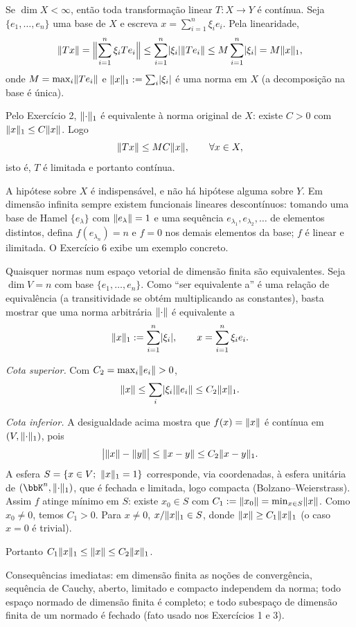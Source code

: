 \begin{exercicio}{Se $\dim X<\infty$, então toda transformação linear $T:X\to Y$ é contínua.}
\sol
Seja $\{e_1,\dots,e_n\}$ uma base de $X$ e escreva $x=\sum_{i=1}^n\xi_ie_i$. Pela linearidade,
\[ \lVert Tx\rVert=\Bigl\|\sum_{i=1}^n\xi_iTe_i\Bigr\|\le\sum_{i=1}^n\lvert\xi_i\rvert\lVert Te_i\rVert\le M\sum_{i=1}^n\lvert\xi_i\rvert=M\lVert x\rVert_1, \]
onde $M=\max_i\lVert Te_i\rVert$ e $\lVert x\rVert_1:=\sum_i\lvert\xi_i\rvert$ é uma norma em $X$ (a decomposição na base é única).

Pelo Exercício 2, $\lVert\cdot\rVert_1$ é equivalente à norma original de $X$: existe $C>0$ com $\lVert x\rVert_1\le C\lVert x\rVert$. Logo
\[ \lVert Tx\rVert\le MC\lVert x\rVert,\qquad \forall x\in X, \]
isto é, $T$ é limitada e portanto contínua.

\begin{obs}
A hipótese sobre $X$ é indispensável, e não há hipótese alguma sobre $Y$. Em dimensão infinita sempre existem funcionais lineares descontínuos: tomando uma base de Hamel $\{e_\lambda\}$ com $\lVert e_\lambda\rVert=1$ e uma sequência $e_{\lambda_1},e_{\lambda_2},\dots$ de elementos distintos, defina $f(e_{\lambda_n})=n$ e $f=0$ nos demais elementos da base; $f$ é linear e ilimitada. O Exercício 6 exibe um exemplo concreto.
\end{obs}
\end{exercicio}

\begin{exercicio}{Quaisquer normas num espaço vetorial de dimensão finita são equivalentes.}
\sol
Seja $\dim V=n$ com base $\{e_1,\dots,e_n\}$. Como ``ser equivalente a'' é uma relação de equivalência (a transitividade se obtém multiplicando as constantes), basta mostrar que uma norma arbitrária $\lVert\cdot\rVert$ é equivalente a
\[ \lVert x\rVert_1:=\sum_{i=1}^n\lvert\xi_i\rvert,\qquad x=\sum_{i=1}^n\xi_ie_i. \]

\emph{Cota superior.} Com $C_2=\max_i\lVert e_i\rVert>0$,
\[ \lVert x\rVert\le\sum_i\lvert\xi_i\rvert\lVert e_i\rVert\le C_2\lVert x\rVert_1. \]

\emph{Cota inferior.} A desigualdade acima mostra que $f(x)=\lVert x\rVert$ é contínua em $(V,\lVert\cdot\rVert_1)$, pois
\[ \bigl|\lVert x\rVert-\lVert y\rVert\bigr|\le\lVert x-y\rVert\le C_2\lVert x-y\rVert_1. \]
A esfera $S=\{x\in V;\ \lVert x\rVert_1=1\}$ corresponde, via coordenadas, à esfera unitária de $(\K^n,\norm{\cdot}_1)$, que é fechada e limitada, logo compacta (Bolzano--Weierstrass). Assim $f$ atinge mínimo em $S$: existe $x_0\in S$ com $C_1:=\lVert x_0\rVert=\min_{x\in S}\lVert x\rVert$. Como $x_0\neq0$, temos $C_1>0$. Para $x\neq0$, $x/\lVert x\rVert_1\in S$, donde $\lVert x\rVert\ge C_1\lVert x\rVert_1$ (o caso $x=0$ é trivial).

Portanto $C_1\lVert x\rVert_1\le\lVert x\rVert\le C_2\lVert x\rVert_1$.

\begin{obs}
Consequências imediatas: em dimensão finita as noções de convergência, sequência de Cauchy, aberto, limitado e compacto independem da norma; todo espaço normado de dimensão finita é completo; e todo subespaço de dimensão finita de um normado é fechado (fato usado nos Exercícios 1 e 3).
\end{obs}
\end{exercicio}

